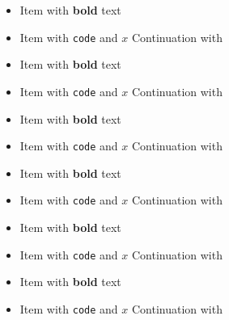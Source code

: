 \begin{itemize}
\item Item with \textbf{bold} text
\item Item with \texttt{code} and $x$
Continuation with \cite{source2024}
\end{itemize}
\begin{itemize}
\item Item with \textbf{bold} text
\item Item with \texttt{code} and $x$
Continuation with \cite{source2024}
\end{itemize}
\begin{itemize}
\item Item with \textbf{bold} text
\item Item with \texttt{code} and $x$
Continuation with \cite{source2024}
\end{itemize}
\begin{frame}[t]
\begin{itemize}
\item Item with \textbf{bold} text
\item Item with \texttt{code} and $x$
Continuation with \cite{source2024}
\end{itemize}
\end{frame}

\begin{frame}[t]
\begin{itemize}
\item Item with \textbf{bold} text
\item Item with \texttt{code} and $x$
Continuation with \cite{source2024}
\end{itemize}
\end{frame}

\begin{frame}[t]
\begin{itemize}
\item Item with \textbf{bold} text
\item Item with \texttt{code} and $x$
Continuation with \cite{source2024}
\end{itemize}
\end{frame}


